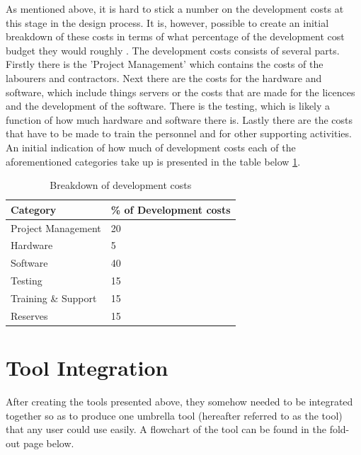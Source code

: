 As mentioned above, it is hard to stick a number on the development costs at this stage in the design process. It is, however, possible to create an initial breakdown of these costs in terms of what percentage of the development cost budget they would roughly . The development costs consists of several parts. Firstly there is the 'Project Management' which contains the costs of the labourers and contractors. Next there are the costs for the hardware and software, which include things servers or the costs that are made for the licences and the development of the software. There is the testing, which is likely a function of how much hardware and software there is. Lastly there are the costs that have to be made to train the personnel and for other supporting activities. An initial indication of how much of development costs each of the aforementioned categories take up is presented in the table below \ref{Devcosts}. 



\begin{table}[H]
\centering
\captionsetup{justification=centering}
\caption{Breakdown of development costs}
\label{Devcosts}
\begin{tabular}{@{}ll@{}}
Category            & \% of Development costs \\ \midrule
Project Management  & 20                      \\
Hardware            & 5                       \\
Software            & 40                      \\
Testing             & 15                      \\
Training \& Support & 15                      \\
Reserves            & 15                      \\ \bottomrule
\end{tabular}
\end{table}







\section{Tool Integration} 
\label{sec:toolintegration}

After creating the tools presented above, they somehow needed to be integrated together so as to produce one umbrella tool (hereafter referred to as the tool) that any user could use easily. A flowchart of the tool can be found in the fold-out page below. 

